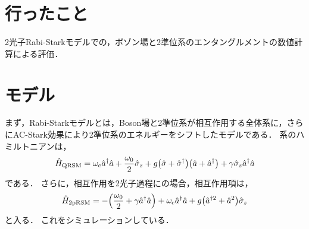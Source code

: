 \documentclass{report}
\begin{document}
    \section{行ったこと}
      2光子Rabi-Starkモデルでの，ボゾン場と2準位系のエンタングルメントの数値計算による評価．
    \section{モデル}
      まず，Rabi-Starkモデルとは，Boson場と2準位系が相互作用する全体系に，さらにAC-Stark効果により2準位系のエネルギーをシフトしたモデルである．
      系のハミルトニアンは，
      \begin{align}
        \hat{H}_{\mathrm{QRSM}} = \omega_{\mathrm{c}}\hat{a}^{\dag}\hat{a} + \frac{\omega_0}{2}\hat{\sigma}_z + g\qty(\hat{\sigma} + \hat{\sigma}^{\dag})\qty(\hat{a} + \hat{a}^{\dag}) + \gamma\hat{\sigma}_z\hat{a}^{\dag}\hat{a}
      \end{align}
      である．
      さらに，相互作用を2光子過程にの場合，相互作用項は，
      \begin{align}
        \hat{H}_{\mathrm{2pRSM}} = -\qty(\frac{\omega_0}{2} + \gamma\hat{a}^{\dag}\hat{a}) + \omega_{\mathrm{c}}\hat{a}^{\dag}\hat{a} + g\qty(\hat{a}^{\dag 2} + \hat{a}^2)\hat{\sigma}_z
      \end{align}
      と入る．
      これをシミュレーションしている．
\end{document}
